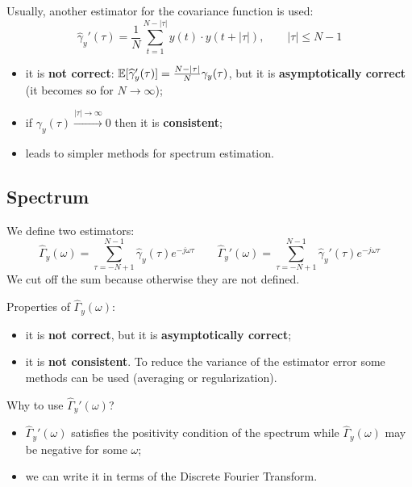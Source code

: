 Usually, another estimator for the covariance function is used:
\[
	\boxed{\hat{\gamma}_{y}'(\tau) = \frac{1}{N} \sum_{t=1}^{N-|\tau|} y(t)\cdot y(t+|\tau|), \qquad |\tau|\leq N-1}
\]
\begin{itemize}
	\item it is \textbf{not correct}: $\mathbb{E}[\widehat{\gamma}_{y}'(\tau)]=\frac{N-|\tau|}{N}\gamma _{y}(\tau)$, but it is \textbf{asymptotically correct} (it becomes so for $N\to\infty$);
	\item if $\gamma _{y}(\tau )\xrightarrow{|\tau|\to\infty} 0$ then it is \textbf{consistent};
	\item leads to simpler methods for spectrum estimation.
\end{itemize}

\subsection{Spectrum}

We define two estimators:
\[
	\boxed{\hat{\Gamma}_{y}(\omega) = \sum_{\tau = -N+1}^{N-1} \hat{\gamma}_{y}(\tau) e^{-j\omega\tau}}
	\qquad
	\boxed{\hat{\Gamma}_{y}'(\omega) = \sum_{\tau = -N+1}^{N-1} \hat{\gamma}_{y}'(\tau) e^{-j\omega\tau}}
\]
We cut off the sum because otherwise they are not defined.

Properties of $\hat{\Gamma}_{y}(\omega)$:
\begin{itemize}
	\item it is \textbf{not correct}, but it is \textbf{asymptotically correct};
	\item it is \textbf{not consistent}. To reduce the variance of the estimator error some methods can be used (averaging or regularization).
\end{itemize}

Why to use $\hat{\Gamma}_{y}'(\omega)$?
\begin{itemize}
	\item $\hat{\Gamma}_{y}'(\omega)$ satisfies the positivity condition of the spectrum while $\hat{\Gamma}_{y}(\omega)$ may be negative for some $\omega$;
	\item we can write it in terms of the Discrete Fourier Transform.

\end{itemize}